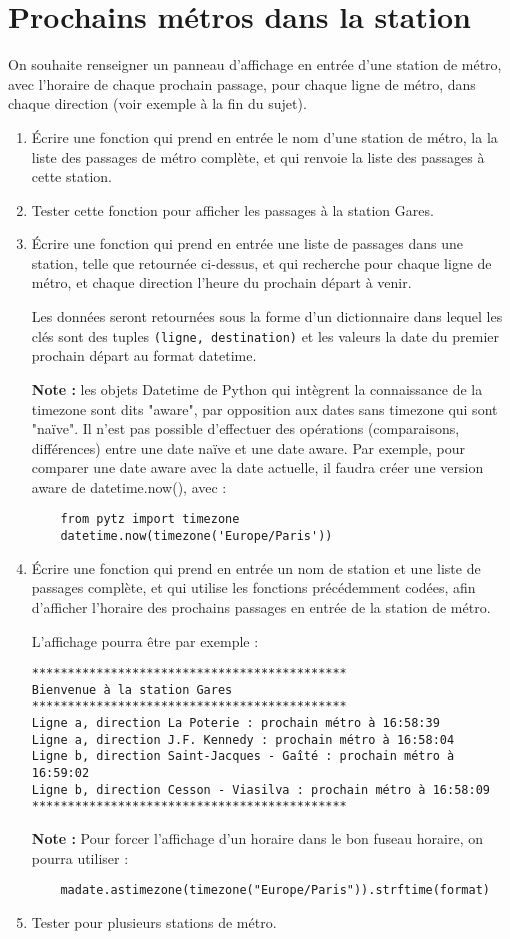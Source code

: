 \documentclass[11pt,a4paper]{article}
\begin{document}
\section{Prochains métros dans la station}


On souhaite renseigner un panneau d'affichage en entrée d'une station de métro, avec l'horaire de chaque prochain passage, pour chaque ligne de métro, dans chaque direction (voir exemple à la fin du sujet). 

\begin{enumerate}
    \item Écrire une fonction qui prend en entrée le nom d'une station de métro, la la liste des passages de métro complète, et qui renvoie la liste des passages à cette station. 
    \item Tester cette fonction pour afficher les passages à la station Gares.
    
    \item Écrire une fonction qui prend en entrée une liste de passages dans une station, telle que retournée ci-dessus, et qui recherche pour chaque ligne de métro, et chaque direction l'heure du prochain départ à venir. 
    
    Les données seront retournées sous la forme d'un dictionnaire dans lequel les clés sont des tuples \verb+(ligne, destination)+ et les valeurs la date du premier prochain départ au format datetime. 
    
    \textbf{Note :} les objets Datetime de Python qui intègrent la connaissance de la timezone sont dits "aware", par opposition aux dates sans timezone qui sont "naïve". Il n'est pas possible d'effectuer des opérations (comparaisons, différences) entre une date naïve et une date aware. Par exemple, pour comparer une date aware avec la date actuelle, il faudra créer une version aware de datetime.now(), avec : 
\begin{verbatim}
    from pytz import timezone
    datetime.now(timezone('Europe/Paris'))
\end{verbatim}

    \item Écrire une fonction qui prend en entrée un nom de station et une liste de passages complète, et qui utilise les fonctions précédemment codées, afin d'afficher l'horaire des prochains passages en entrée de la station de métro. 
    
    L'affichage pourra être par exemple : 
    \begin{verbatim}
********************************************
Bienvenue à la station Gares
********************************************
Ligne a, direction La Poterie : prochain métro à 16:58:39
Ligne a, direction J.F. Kennedy : prochain métro à 16:58:04
Ligne b, direction Saint-Jacques - Gaîté : prochain métro à 16:59:02
Ligne b, direction Cesson - Viasilva : prochain métro à 16:58:09
********************************************
\end{verbatim}

\textbf{Note :} Pour forcer l'affichage d'un horaire dans le bon fuseau horaire, on pourra utiliser : 
\begin{verbatim}
    madate.astimezone(timezone("Europe/Paris")).strftime(format)
\end{verbatim}

\item Tester pour plusieurs stations de métro.
\end{enumerate}
\end{document}
